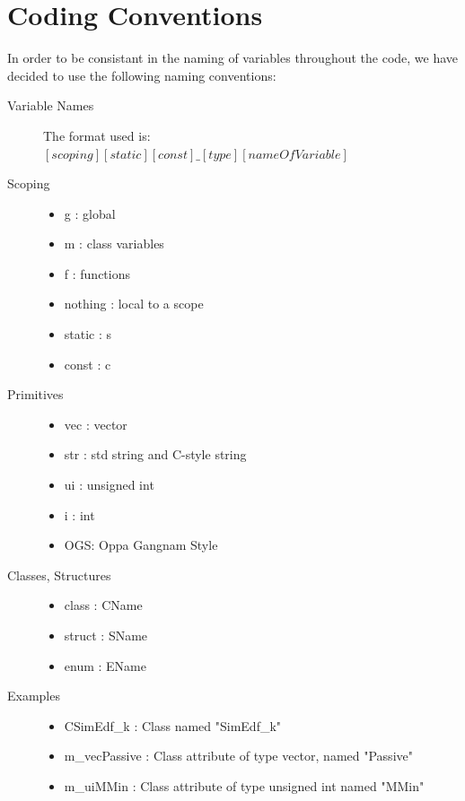 \documentclass[11pt, a4paper,titlepage]{article}
\begin{document}
\pagebreak 
\appendix
\section{Coding Conventions}

In order to be consistant in the naming of variables throughout the code, we have decided to use the following naming conventions:

\begin{description}

\item [Variable Names] \hfill

The format used is: $ [scoping][static][const]\_[type][nameOfVariable] $

\item [Scoping] \hfill

\begin{itemize}
\item g : global 
\item m : class variables
\item f : functions
\item nothing : local to a scope
\item static : s
\item const : c
\end{itemize} 

\item [Primitives] \hfill

\begin{itemize}
\item vec : vector
\item str : std string and C-style string
\item ui : unsigned int
\item i : int
\item OGS: Oppa Gangnam Style
\end{itemize}

\item [Classes, Structures] \hfill

\begin{itemize}
\item class : CName
\item struct : SName
\item enum : EName 
\end{itemize}

\item [Examples] \hfill

\begin{itemize}

\item CSimEdf\_k : Class named "SimEdf\_k"
\item m\_vecPassive : Class attribute of type vector, named "Passive" 
\item m\_uiMMin : Class attribute of type unsigned int named "MMin"
\end{itemize}

\end{description}
\end{document}
